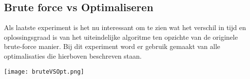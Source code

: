 \documentclass[Main.tex]{subfiles}
\begin{document}
\subsection{Brute force vs Optimaliseren}

Als laatste experiment is het nu interessant om te zien wat het verschil in tijd en oplossingsgraad is van het uiteindelijke algoritme ten opzichte van de originele brute-force manier. Bij dit experiment word er gebruik gemaakt van alle optimalisaties die hierboven beschreven staan.

\begin{center}
\texttt{[image: bruteVSOpt.png]}
\end{center}
\end{document}
